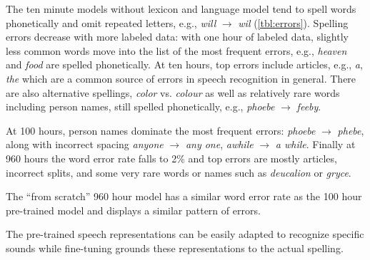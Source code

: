 \documentclass{article}
\begin{document}
The ten minute models without lexicon and language model tend to spell words phonetically and omit repeated letters, e.g., \emph{will} $\rightarrow$ \emph{wil} (\autoref{tbl:errors}).
Spelling errors decrease with more labeled data: 
with one hour of labeled data, slightly less common words move into the list of the most frequent errors, e.g., \emph{heaven} and \emph{food} are spelled phonetically. 
At ten hours, top errors include articles, e.g., \emph{a}, \emph{the} which are a common source of errors in speech recognition in general. 
There are also alternative spellings, \emph{color} vs. \emph{colour} as well as relatively rare words including person names, still spelled phonetically, e.g., \emph{phoebe} $\rightarrow$ \emph{feeby}. 

At 100 hours, person names dominate the most frequent errors: 
\emph{phoebe} $\rightarrow$ \emph{phebe}, along with incorrect spacing \emph{anyone} $\rightarrow$ \emph{any one}, \emph{awhile} $\rightarrow$ \emph{a while}. 
Finally at 960 hours the word error rate falls to 2\% and top errors are mostly articles, incorrect splits, and some very rare words or names such as \emph{deucalion} or \emph{gryce}.

The “from scratch” 960 hour model has a similar word error rate as the 100 hour pre-trained model and displays a similar pattern of errors.

The pre-trained speech representations can be easily adapted to recognize specific sounds while fine-tuning grounds these representations to the actual spelling.
\end{document}
